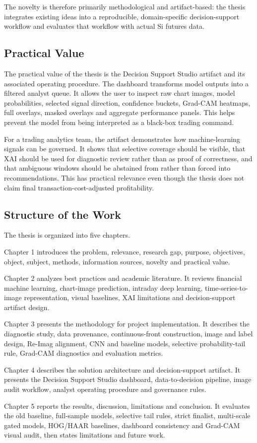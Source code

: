 The novelty is therefore primarily methodological and artifact-based: the thesis integrates existing ideas into a reproducible, domain-specific decision-support workflow and evaluates that workflow with actual Si futures data.

\subsection{Practical Value}
\label{subsec:practical_value}

The practical value of the thesis is the Decision Support Studio artifact and its associated operating procedure. The dashboard transforms model outputs into a filtered analyst queue. It allows the user to inspect raw chart images, model probabilities, selected signal direction, confidence buckets, Grad-CAM heatmaps, full overlays, masked overlays and aggregate performance panels. This helps prevent the model from being interpreted as a black-box trading command.

For a trading analytics team, the artifact demonstrates how machine-learning signals can be governed. It shows that selective coverage should be visible, that XAI should be used for diagnostic review rather than as proof of correctness, and that ambiguous windows should be abstained from rather than forced into recommendations. This has practical relevance even though the thesis does not claim final transaction-cost-adjusted profitability.

\subsection{Structure of the Work}
\label{subsec:structure}

The thesis is organized into five chapters.

Chapter 1 introduces the problem, relevance, research gap, purpose, objectives, object, subject, methods, information sources, novelty and practical value.

Chapter 2 analyzes best practices and academic literature. It reviews financial machine learning, chart-image prediction, intraday deep learning, time-series-to-image representation, visual baselines, XAI limitations and decision-support artifact design.

Chapter 3 presents the methodology for project implementation. It describes the diagnostic study, data provenance, continuous-front construction, image and label design, Re-Imag alignment, CNN and baseline models, selective probability-tail rule, Grad-CAM diagnostics and evaluation metrics.

Chapter 4 describes the solution architecture and decision-support artifact. It presents the Decision Support Studio dashboard, data-to-decision pipeline, image audit workflow, analyst operating procedure and governance rules.

Chapter 5 reports the results, discussion, limitations and conclusion. It evaluates the old baseline, full-sample models, selective tail rules, strict finalist, multi-scale gated models, HOG/HAAR baselines, dashboard consistency and Grad-CAM visual audit, then states limitations and future work.

